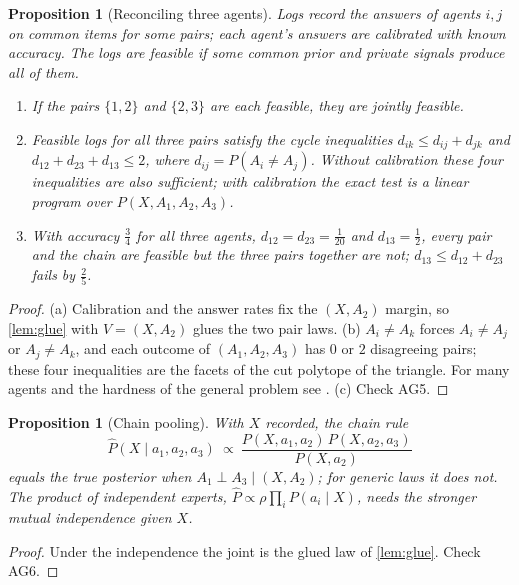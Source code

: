 \documentclass[11pt]{article}
\newtheorem{proposition}[theorem]{Proposition}
\theoremstyle{definition}
\theoremstyle{remark}
\begin{document}
\begin{proposition}[Reconciling three agents]\label{prop:glue}
Logs record the answers of agents $i,j$ on common items for some pairs; each agent's answers are calibrated with known accuracy. The logs
are \emph{feasible} if some common prior and private signals produce all of them.
\begin{enumerate}[label=(\alph*)]
\item If the pairs $\{1,2\}$ and $\{2,3\}$ are each feasible, they are jointly feasible.
\item Feasible logs for all three pairs satisfy the cycle inequalities $d_{ik}\le d_{ij}+d_{jk}$ and $d_{12}+d_{23}+d_{13}\le2$, where
  $d_{ij}=P(A_i\ne A_j)$. Without calibration these four inequalities are also sufficient; with calibration the exact test is a linear
  program over $P(X,A_1,A_2,A_3)$.
\item With accuracy $\tfrac34$ for all three agents, $d_{12}=d_{23}=\tfrac1{20}$ and $d_{13}=\tfrac12$, every pair and the chain are feasible
  but the three pairs together are not; $d_{13}\le d_{12}+d_{23}$ fails by $\tfrac25$.
\end{enumerate}
\end{proposition}
\begin{proof}
(a) Calibration and the answer rates fix the $(X,A_2)$ margin, so \cref{lem:glue} with $V=(X,A_2)$ glues the two pair laws.
(b) $A_i\ne A_k$ forces $A_i\ne A_j$ or $A_j\ne A_k$, and each outcome of $(A_1,A_2,A_3)$ has $0$ or $2$ disagreeing pairs; these four
inequalities are the facets of the cut polytope of the triangle. For many agents and the hardness of the general problem see
\cite{ArieliEtAl2021}. (c) Check AG5.
\end{proof}

\begin{proposition}[Chain pooling]\label{prop:chain}
With $X$ recorded, the chain rule
\[
\hat P(X\mid a_1,a_2,a_3)\ \propto\ \frac{P(X,a_1,a_2)\,P(X,a_2,a_3)}{P(X,a_2)}
\]
equals the true posterior when
$A_1\perp A_3\mid(X,A_2)$; for generic laws it does not. The product of independent experts, $\hat P\propto\rho\prod_iP(a_i\mid X)$,
needs the stronger mutual independence given $X$.
\end{proposition}
\begin{proof}
Under the independence the joint is the glued law of \cref{lem:glue}. Check AG6.
\end{proof}
\end{document}
